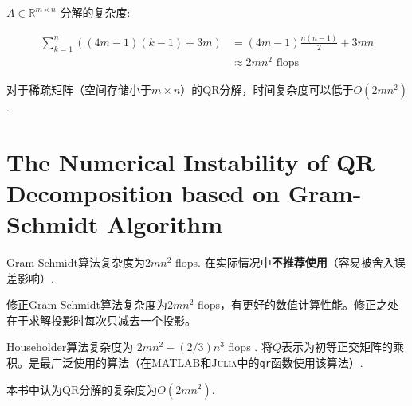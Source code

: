 $ A \in \mathbb{R}^{m \times n} $ 分解的复杂度:

$$ \begin{aligned} \sum_{k=1}^{n}((4 m-1)(k-1)+3 m) &=(4 m-1) \frac{n(n-1)}{2}+3 m n \\ & \approx 2 m n^{2} \text { flops } \end{aligned} $$

对于稀疏矩阵（空间存储小于$m \times n$）的QR分解，时间复杂度可以低于$O(2mn^2)$. 



\section{The Numerical Instability of QR Decomposition based on Gram-Schmidt Algorithm}

Gram-Schmidt算法复杂度为$2mn^2$ flops. 在实际情况中\textbf{不推荐使用}（容易被舍入误差影响）.

修正Gram-Schmidt算法复杂度为$2mn^2$ flops，有更好的数值计算性能。修正之处在于求解投影时每次只减去一个投影。

Householder算法复杂度为 $ 2 m n^{2}-(2 / 3) n^{3} $ flops .
将$Q$表示为初等正交矩阵的乘积。是最广泛使用的算法（在\textsc{MATLAB}和\textsc{Julia}中的\verb|qr|函数使用该算法）.

本书中认为QR分解的复杂度为$O(2mn^2)$.

